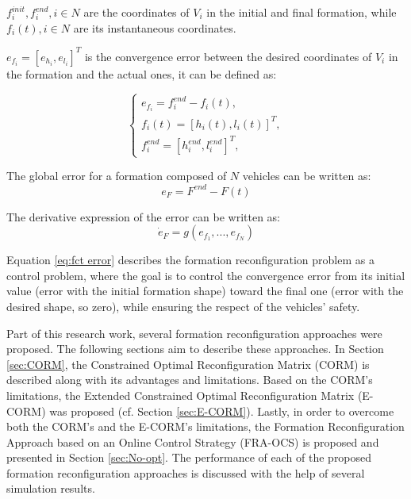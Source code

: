 $f_i ^{init},f_i ^{end}, i\in {N}$ are the coordinates of $V_i$ in the initial and final formation, while $f_{i}(t), i\in{N}$ are its instantaneous coordinates. 

$e_{f_{i}}=[e_{h_{i}},e_{l_{i}}]^T $ is the convergence error between the desired coordinates of $V_i$ in the formation and the actual ones, it can be defined as: 

\begin{equation}\label{eq: errorbetweenfinitandfendforvi}
\begin{cases}
    e_{f_{i}}=f_{i}^{end} - f_{i}(t),\\
    f_{i}(t)=[h_{i}(t), l_{i}(t)]^T,\\
    f_{i}^{end}=[h_{i}^{end},l_{i}^{end}]^T,
\end{cases}
\end{equation}

The global error for a formation composed of ${N}$ vehicles can be written as: 
\vspace{-2.3mm}
\begin{equation}
    e_{F}=F^{end} - F(t)
\end{equation}

The derivative expression of the error can be written as: 
\begin{equation} \label{eq:fct error}
    \dot{e}_F=g(e_{f_{1}}, ..., e_{f_{N}})
\end{equation}


Equation \ref{eq:fct error} describes the formation reconfiguration problem as a control problem, where the goal is to control the convergence error from its initial value (error with the initial formation shape) toward the final one (error with the desired shape, so zero), while ensuring the respect of the vehicles' safety. 

 Part of this research work, several formation reconfiguration approaches were proposed. The following sections aim to describe these approaches. In Section \ref{sec:CORM}, the Constrained Optimal Reconfiguration Matrix (CORM) is described along with its advantages and limitations. Based on the CORM's limitations, the Extended Constrained Optimal Reconfiguration Matrix (E-CORM) was proposed (cf. Section \ref{sec:E-CORM}). Lastly, in order to overcome both the CORM's and the E-CORM's limitations, the Formation Reconfiguration Approach based on an Online Control Strategy (FRA-OCS) is proposed and presented in Section \ref{sec:No-opt}. The performance of each of the proposed formation reconfiguration approaches is discussed with the help of several simulation results. 





